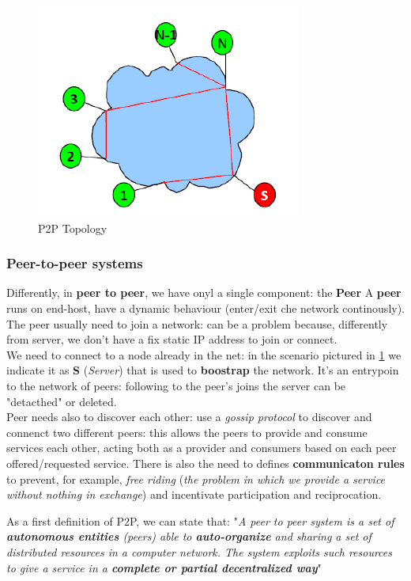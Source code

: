 \documentclass[10pt,a4paper]{report}
\begin{document}
\begin{figure}
	\centering
	\includegraphics[scale=0.50]{images/Pasted image 20230222120810.png}
	\caption{P2P Topology}
	\label{p2p-schema}
\end{figure}

\subsubsection{Peer-to-peer systems}\label{sec:peer-to-peer-systems}
Differently, in \textbf{peer to peer}, we have onyl a single component: the \textbf{Peer}
A \textbf{peer} runs on end-host, have a dynamic behaviour (enter/exit che network continously). The peer usually need to join a network: can be a problem because, differently from server, we don't have a fix static IP address to join or connect. \\
We need to connect to a node already in the net: in the scenario pictured in \ref{p2p-schema} we indicate it as \textbf{S} (\textit{Server}) that is used to \textbf{boostrap} the network. It's an entrypoin to the network of peers: following to the peer's joins the server can be "detacthed" or deleted.\\
Peer needs also to discover each other: use a \textit{gossip protocol} to discover and connenct two different peers: this allows the peers to provide and consume services each other, acting both as a provider and consumers based on each peer offered/requested service.
There is also the need to defines \textbf{communicaton rules} to prevent, for example, \textit{free riding} (\textit{the problem in which we provide a service without nothing in exchange}) and incentivate participation and reciprocation.

As a first definition of P2P, we can state that:
"\textit{A peer to peer system is a set of \textbf{autonomous entities} (peers) able to \textbf{auto-organize} and sharing a set of distributed resources in a computer network. The system exploits such resources to give a service in a \textbf{complete or partial decentralized way}}"
\end{document}
